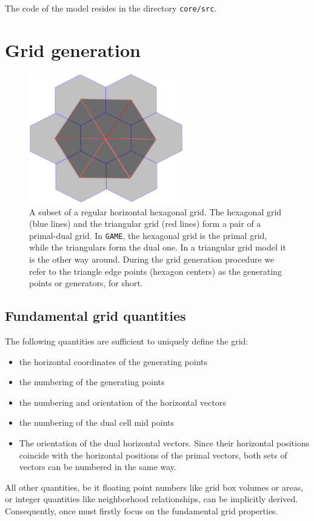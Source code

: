 \documentclass[10pt]{report}
\begin{document}
The code of the model resides in the directory \texttt{core/src}.

\chapter{Grid generation}
\label{chap:grid_generation}

\begin{figure}
\begin{center}
\includegraphics[width = 0.6\textwidth]{hexagonal_grid_0.pdf}
\caption{A subset of a regular horizontal hexagonal grid. The hexagonal grid (blue lines) and the triangular grid (red lines) form a pair of a primal-dual grid. In \texttt{GAME}, the hexagonal grid is the primal grid, while the triangulars form the dual one. In a triangular grid model it is the other way around. During the grid generation procedure we refer to the triangle edge points (hexagon centers) as the generating points or generators, for short.}
\label{fig:hexagonal_grid_0}
\end{center}
\end{figure}

\section{Fundamental grid quantities}
\label{sec:fundamental_grid_quantities}

The following quantities are sufficient to uniquely define the grid:

\begin{itemize}
\item the horizontal coordinates of the generating points
\item the numbering of the generating points
\item the numbering and orientation of the horizontal vectors
\item the numbering of the dual cell mid points
\item The orientation of the dual horizontal vectors. Since their horizontal positions coincide with the horizontal positions of the primal vectors, both sets of vectors can be numbered in the same way.
\end{itemize}
%
All other quantities, be it floating point numbers like grid box volumes or areas, or integer quantities like neighborhood relationships, can be implicitly derived. Consequently, once must firstly focus on the fundamental grid properties.
\end{document}
